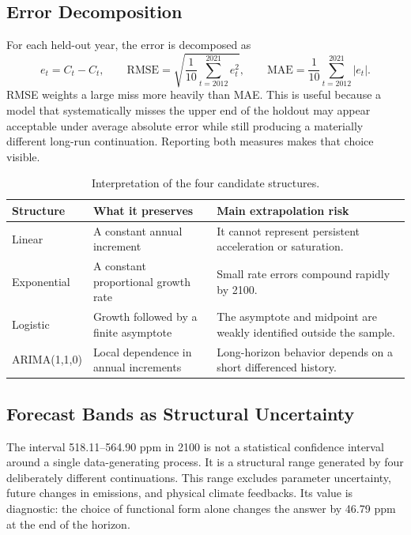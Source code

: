 \documentclass{mcmthesis}
\begin{document}
\subsection{Error Decomposition}
For each held-out year, the error is decomposed as
\begin{equation}
 e_t=C_t-\widehat C_t,\qquad
 \mathrm{RMSE}=\sqrt{\frac{1}{10}\sum_{t=2012}^{2021}e_t^2},\qquad
 \mathrm{MAE}=\frac{1}{10}\sum_{t=2012}^{2021}|e_t|.
\end{equation}
RMSE weights a large miss more heavily than MAE. This is useful because a model that systematically misses the upper end of the holdout may appear acceptable under average absolute error while still producing a materially different long-run continuation. Reporting both measures makes that choice visible.

\begin{table}[H]
\centering
\small
\caption{Interpretation of the four candidate structures.}
\begin{tabularx}{\textwidth}{lXX}
\toprule
Structure & What it preserves & Main extrapolation risk \\
\midrule
Linear & A constant annual increment & It cannot represent persistent acceleration or saturation. \\
Exponential & A constant proportional growth rate & Small rate errors compound rapidly by 2100. \\
Logistic & Growth followed by a finite asymptote & The asymptote and midpoint are weakly identified outside the sample. \\
ARIMA(1,1,0) & Local dependence in annual increments & Long-horizon behavior depends on a short differenced history. \\
\bottomrule
\end{tabularx}
\end{table}

\subsection{Forecast Bands as Structural Uncertainty}
The interval 518.11--564.90 ppm in 2100 is not a statistical confidence interval around a single data-generating process. It is a structural range generated by four deliberately different continuations. This range excludes parameter uncertainty, future changes in emissions, and physical climate feedbacks. Its value is diagnostic: the choice of functional form alone changes the answer by 46.79 ppm at the end of the horizon.
\end{document}
